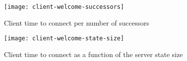 \begin{figure}
    \centering
    \texttt{[image: client-welcome-successors]}
    \caption{Client time to connect per number of successors}
    \label{fig:client-welcome-successors}
\end{figure}

\begin{figure}
    \centering
    \texttt{[image: client-welcome-state-size]}
    \caption{Client time to connect as a function of the server state size}
    \label{fig:client-welcome-state-size}
\end{figure}

